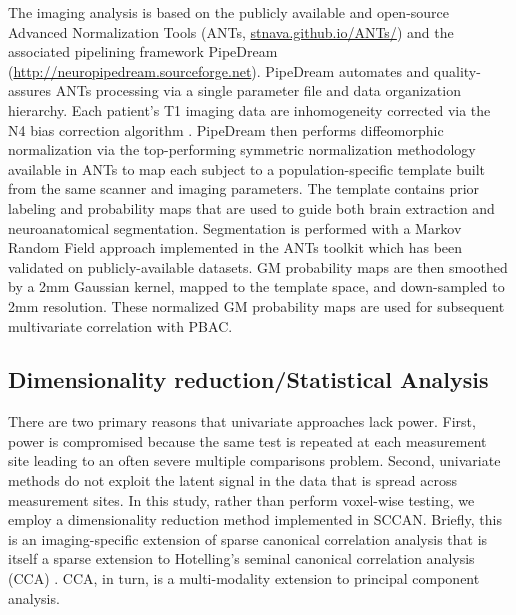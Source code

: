 \documentclass[preprint,authoryear,12pt]{elsarticle}
\begin{document}
The imaging analysis is based on the publicly available and open-source Advanced Normalization Tools (ANTs, \url{stnava.github.io/ANTs/}) and the associated pipelining framework PipeDream (\url{http://neuropipedream.sourceforge.net}).  PipeDream automates and quality-assures ANTs processing via a single parameter file and data organization hierarchy.  Each patient's T1 imaging data are inhomogeneity corrected via the N4 bias correction algorithm \citet{Tustison2010}.  PipeDream then performs diffeomorphic normalization via the top-performing symmetric normalization methodology available in ANTs \citet{Avants2008,Avants2011a,wbir2012,Tustison2012} to map each subject to a population-specific template built from the same scanner and imaging parameters.  The template contains prior labeling and probability maps that are used to guide both brain extraction and neuroanatomical segmentation.  Segmentation is performed with a Markov Random Field approach \citet{Avants2011} implemented in the ANTs toolkit which has been validated on publicly-available datasets.  GM probability maps are then smoothed by a 2mm Gaussian kernel, mapped to the template space, and down-sampled to 2mm resolution.  These normalized GM probability maps are used for subsequent multivariate correlation with PBAC.

\subsection{Dimensionality reduction/Statistical Analysis} 

There are two primary reasons that univariate approaches lack power.  First, power is compromised because the same test is repeated at each measurement site leading to an often severe multiple comparisons problem.  Second, univariate methods do not exploit the latent signal in the data that is spread across measurement sites.  In this study, rather than perform voxel-wise testing, we employ a dimensionality reduction method implemented in SCCAN.  Briefly, this is an imaging-specific extension of sparse canonical correlation analysis \citet{Avants2010,Cao2009,parkhomenko,witten_extensions_2009-1,witten} that is itself a sparse extension to Hotelling's seminal canonical correlation analysis (CCA) \citet{Hotelling1936,hotellingcca}.  CCA, in turn, is a multi-modality extension to  principal component analysis. 
\end{document}
